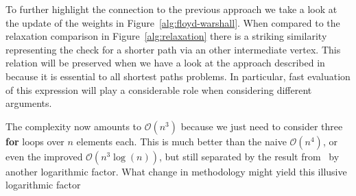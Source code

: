 To further highlight the connection to the previous approach we take a look at the update of the weights in Figure~\ref{alg:floyd-warshall}.
When compared to the relaxation comparison in Figure~\ref{alg:relaxation} there is a striking similarity representing the check for a shorter path via an other intermediate vertex.
This relation will be preserved when we have a look at the approach described in~\cite{Chan2007} because it is essential to all shortest paths problems.
In particular, fast evaluation of this expression will play a considerable role when considering different arguments.

The complexity now amounts to $\mathcal{O}\left( n^3 \right)$ because we just need to consider three \textbf{for} loops over $n$ elements each.
This is much better than the naive $\mathcal{O}\left( n^4 \right)$, or even the improved $\mathcal{O}\left( n^3 \log(n) \right)$, but still separated by the result from~\cite{Chan2007} by another logarithmic factor.
What change in methodology might yield this illusive logarithmic factor\textinterrobang{}
